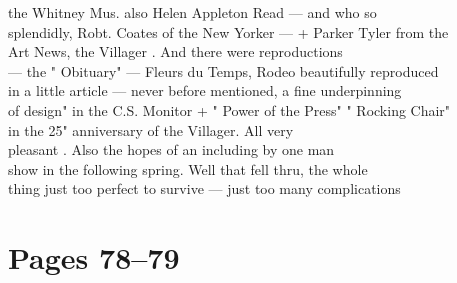 \documentclass[11pt,a4paper]{article}
\begin{document}
{the Whitney Mus. also Helen Appleton Read --- and who so \\
splendidly, Robt. Coates of the New Yorker --- + Parker Tyler from the \\
Art News, the Villager . And there were reproductions \\
--- the " Obituary" --- Fleurs du Temps, Rodeo beautifully reproduced \\
in a little article --- never before mentioned, a fine underpinning \\
of design" in the C.S. Monitor + " Power of the Press" " Rocking Chair" \\
 in the 25" anniversary of the Villager. All very \\
pleasant . Also the hopes of an including by one man \\
show in the following spring. Well that fell thru, the whole \\
thing just too perfect to survive --- just too many complications}



\section{Pages 78--79}
\end{document}
